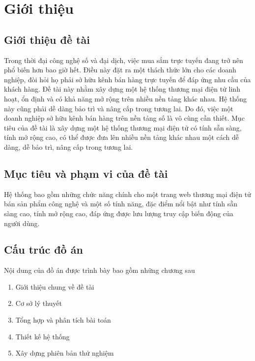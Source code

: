 \chapter{Giới thiệu}


\section{Giới thiệu đề tài}
\noindent Trong thời đại công nghệ số và đại dịch, việc mua sắm trực tuyến đang trở nên phổ biến hơn bao giờ hết. Điều này đặt ra một thách thức lớn cho các doanh nghiệp, đòi hỏi họ phải sở hữu kênh bán hàng trực tuyến để đáp ứng nhu cầu của khách hàng. Đề tài này nhằm xây dựng một hệ thống thương mại điện tử linh hoạt, ổn định và có khả năng mở rộng trên nhiều nền tảng khác nhau. Hệ thống này cũng phải dễ dàng bảo trì và nâng cấp trong tương lai. Do đó, việc một doanh nghiệp sở hữu kênh bán hàng trên nền tảng số là vô cùng cần thiết. Mục tiêu của đề tài là xây dựng một hệ thống thương mại điện tử có tính sẵn sàng, tính mở rộng cao, có thể được đưa lên nhiều nền tảng khác nhau một cách dễ dàng, dễ bảo trì, nâng cấp trong tương lai.

\section{Mục tiêu và phạm vi của đề tài}
\noindent Hệ thống bao gồm những chức năng chính cho một trang web thương mại điện tử bán sản phẩm công nghệ và một số tính năng, đặc điểm nổi bật như tính sẵn sàng cao, tính mở rộng cao, đáp ứng được lưu lượng truy cập biến động của người dùng.

\section{Cấu trúc đồ án}
\noindent Nội dung của đồ án được trình bày bao gồm những chương sau

\begin{enumerate}[label=\Roman*., itemsep=0pt, start=1]
    \item Giới thiệu chung về đề tài
    \item Cơ sở lý thuyết
    \item Tổng hợp và phân tích bài toán
    \item Thiết kế hệ thống
    \item Xây dựng phiên bản thử nghiệm
\end{enumerate}